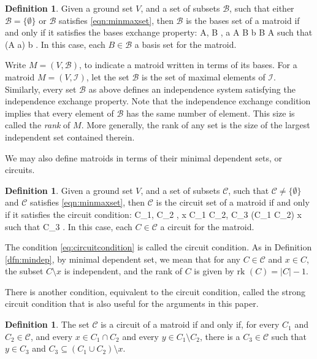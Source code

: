 \documentclass[11pt]{article}
\newcommand{\rk}{\textrm{rk }}
\def\ba #1\ea{\begin{align} #1 \end{align}}
\newcommand{\sI}{\mathscr{I}}
\newcommand{\sC}{\mathscr{C}}
\newcommand{\cC}{\mathcal{C}}
\newcommand{\sB}{\mathscr{B}}
\theoremstyle{remark}
\theoremstyle{definition}
\newtheorem{dfn}[thm]{Definition}
\begin{document}
\begin{dfn} \label{dfn:matroidbasis}
Given a ground set $V$, and a set of subsets $\sB$, such that either $\sB = \{\emptyset\}$ or $\sB$ satisfies \eqref{eqn:minmaxset}, then $\sB$ is the bases set of a matroid if and only if it satisfies the bases exchange property:
\ba \forall \; A, B \in \sB, \; a \in A \setminus B\; \exists b \in B \setminus A \textrm{ such that } (A \setminus a) \cup b \in \sB\;. \label{eq:basisexchange}\ea In this case, each $B \in \sB$ a basis set for the matroid.
\end{dfn}

Write $M= (V, \sB)$, to indicate a matroid written in terms of its bases. For a matroid $M = (V, \sI)$, let the set $\sB$ is the set of maximal elements of $\sI$. Similarly, every set $\sB$ as above defines an independence system satisfying the independence exchange property. Note that the independence exchange condition implies that every element of $\sB$ has the same number of element. This size is called the \emph{rank} of $M$. More generally, the rank of any set is the size of the largest independent set contained therein.

We may also define matroids in terms of their minimal dependent sets, or circuits.

\begin{dfn} \label{dfn:matroidcircuit}
Given a ground set $V$, and a set of subsets $\sC$, such that $\sC \neq \{\emptyset\}$ and $\sC$ satisfies \eqref{eqn:minmaxset}, then $\sC$ is the circuit set of a matroid if and only if it satisfies the circuit condition:
	\ba \forall C_1, C_2 \in \cC, x \in C_1 \cap C_2, \; \exists C_3 \subseteq (C_1 \cup C_2) \setminus x\; \textrm{such that }C_3 \in \cC \;. \label{eq:circuitcondition}\ea In this case, each $C \in \sC$ a circuit for the matroid.
\end{dfn}

The condition \eqref{eq:circuitcondition} is called the circuit condition. As in Definition \ref{dfn:mindep}, by minimal dependent set, we mean that for any $C \in \cC$ and $x \in C$, the subset $C \setminus x$ is independent, and the rank of $C$ is given by $\rk (C)  = |C|-1$. 

There is another condition, equivalent to the circuit condition, called the strong circuit condition that is also useful for the arguments in this paper. 

\begin{dfn}\label{dfn:matroidcircuitstrong} The set $\sC$ is a circuit of a matroid if and only if, for every $C_1$ and $C_2 \in \sC$, and every $x \in C_1 \cap C_2$ and every $y \in C_1 \setminus C_2$, there is a $C_3 \in \sC$ such that $y \in C_3$ and $C_3 \subseteq (C_1 \cup C_2) \setminus x$.
\end{dfn}
\end{document}
